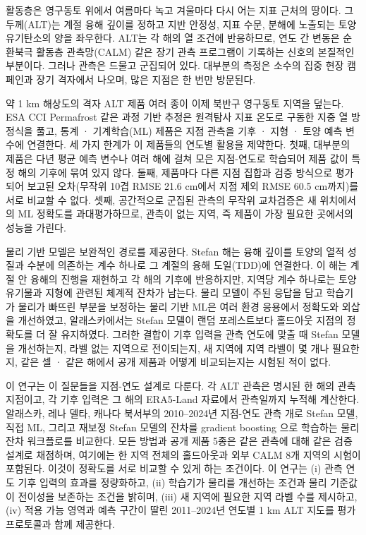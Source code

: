 활동층은 영구동토 위에서 여름마다 녹고 겨울마다 다시 어는 지표 근처의 땅이다. 그 두께(ALT)는 계절 융해 깊이를 정하고 지반 안정성, 지표 수문, 분해에 노출되는 토양 유기탄소의 양을 좌우한다\cite{Hjort2018,Schuur2015,Biskaborn2019}. ALT는 각 해의 열 조건에 반응하므로, 연도 간 변동은 순환북극 활동층 관측망(CALM) 같은 장기 관측 프로그램이 기록하는 신호의 본질적인 부분이다\cite{Nelson1997,Streletskiy2025}. 그러나 관측은 드물고 군집되어 있다. 대부분의 측정은 소수의 집중 현장 캠페인과 장기 격자에서 나오며, 많은 지점은 한 번만 방문된다\cite{Moore2025,Veremeeva2025}.

약 1 km 해상도의 격자 ALT 제품 여러 종이 이제 북반구 영구동토 지역을 덮는다. ESA CCI Permafrost 같은 과정 기반 추정은 원격탐사 지표 온도로 구동한 지중 열 방정식을 풀고\cite{Westermann2024,Westermann2025}, 통계 · 기계학습(ML) 제품은 지점 관측을 기후 · 지형 · 토양 예측 변수에 연결한다\cite{Aalto2018,Ran2022a,Liu2024,Wei2026}. 세 가지 한계가 이 제품들의 연도별 활용을 제약한다. 첫째, 대부분의 제품은 다년 평균 예측 변수나 여러 해에 걸쳐 모은 지점-연도로 학습되어 제품 값이 특정 해의 기후에 묶여 있지 않다. 둘째, 제품마다 다른 지점 집합과 검증 방식으로 평가되어 보고된 오차(무작위 10겹 RMSE 21.6 cm\cite{Liu2024}에서 지점 제외 RMSE 60.5 cm\cite{Wei2026}까지)를 서로 비교할 수 없다. 셋째, 공간적으로 군집된 관측의 무작위 교차검증은 새 위치에서의 ML 정확도를 과대평가하므로\cite{Roberts2017,Ploton2020,MeyerPebesma2022,Wadoux2021}, 관측이 없는 지역, 즉 제품이 가장 필요한 곳에서의 성능을 가린다.

물리 기반 모델은 보완적인 경로를 제공한다. Stefan 해는 융해 깊이를 토양의 열적 성질과 수분에 의존하는 계수 하나로 그 계절의 융해 도일(TDD)에 연결한다\cite{Stefan1891,Riseborough2008,Nelson1997}. 이 해는 계절 안 융해의 진행을 재현하고 각 해의 기후에 반응하지만, 지역당 계수 하나로는 토양 유기물과 지형에 관련된 체계적 잔차가 남는다. 물리 모델이 주된 응답을 담고 학습기가 물리가 빠뜨린 부분을 보정하는 물리 기반 ML은 여러 환경 응용에서 정확도와 외삽을 개선하였고\cite{Willard2022,Read2019,Jia2021}, 알래스카에서는 Stefan 모델이 랜덤 포레스트보다 홀드아웃 지점의 정확도를 더 잘 유지하였다\cite{Gautam2025}. 그러한 결합이 기후 입력을 관측 연도에 맞출 때 Stefan 모델을 개선하는지, 라벨 없는 지역으로 전이되는지, 새 지역에 지역 라벨이 몇 개나 필요한지, 같은 셀 · 같은 해에서 공개 제품과 어떻게 비교되는지는 시험된 적이 없다.

이 연구는 이 질문들을 지점-연도 설계로 다룬다. 각 ALT 관측은 명시된 한 해의 관측 지점이고, 각 기후 입력은 그 해의 ERA5-Land 자료에서 관측일까지 누적해 계산한다\cite{munozsabater2021_era5_land}. 알래스카, 레나 델타, 캐나다 북서부의 2010--2024년 지점-연도 관측 \nncyAll{}개로 Stefan 모델, 직접 ML, 그리고 재보정 Stefan 모델의 잔차를 gradient boosting 으로 학습하는 물리 잔차 워크플로를 비교한다. 모든 방법과 공개 제품 5종은 같은 관측에 대해 같은 검증 설계로 채점하며, 여기에는 한 지역 전체의 홀드아웃과 외부 CALM 8개 지역의 시험이 포함된다. 이것이 정확도를 서로 비교할 수 있게 하는 조건이다. 이 연구는 (i) 관측 연도 기후 입력의 효과를 정량화하고, (ii) 학습기가 물리를 개선하는 조건과 물리 기준값이 전이성을 보존하는 조건을 밝히며, (iii) 새 지역에 필요한 지역 라벨 수를 제시하고, (iv) 적용 가능 영역과 예측 구간이 딸린 2011--2024년 연도별 1 km ALT 지도를 평가 프로토콜과 함께 제공한다.
